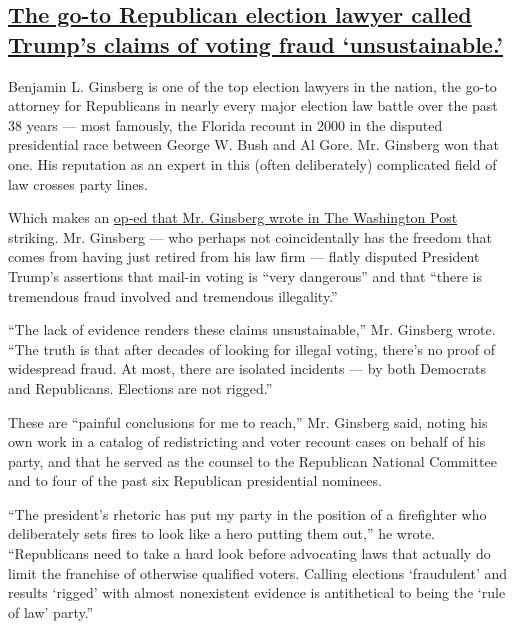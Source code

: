 \hypertarget{the-go-to-republican-election-lawyer-called-trumps-claims-of-voting-fraud-unsustainable}{%
\subsection{\texorpdfstring{\protect\hyperlink{the-go-to-republican-election-lawyer-called-trumps-claims-of-voting-fraud-unsustainable}{The
go-to Republican election lawyer called Trump's claims of voting fraud
`unsustainable.'}}{The go-to Republican election lawyer called Trump's claims of voting fraud `unsustainable.'}}\label{the-go-to-republican-election-lawyer-called-trumps-claims-of-voting-fraud-unsustainable}}

Benjamin L. Ginsberg is one of the top election lawyers in the nation,
the go-to attorney for Republicans in nearly every major election law
battle over the past 38 years --- most famously, the Florida recount in
2000 in the disputed presidential race between George W. Bush and Al
Gore. Mr. Ginsberg won that one. His reputation as an expert in this
(often deliberately) complicated field of law crosses party lines.

Which makes an
\href{https://www.washingtonpost.com/opinions/2020/09/08/republicans-have-insufficient-evidence-call-elections-rigged-fraudulent/}{op-ed
that Mr. Ginsberg wrote in The Washington Post} striking. Mr. Ginsberg
--- who perhaps not coincidentally has the freedom that comes from
having just retired from his law firm --- flatly disputed President
Trump's assertions that mail-in voting is ``very dangerous'' and that
``there is tremendous fraud involved and tremendous illegality.''

``The lack of evidence renders these claims unsustainable,'' Mr.
Ginsberg wrote. ``The truth is that after decades of looking for illegal
voting, there's no proof of widespread fraud. At most, there are
isolated incidents --- by both Democrats and Republicans. Elections are
not rigged.''

These are ``painful conclusions for me to reach,'' Mr. Ginsberg said,
noting his own work in a catalog of redistricting and voter recount
cases on behalf of his party, and that he served as the counsel to the
Republican National Committee and to four of the past six Republican
presidential nominees.

``The president's rhetoric has put my party in the position of a
firefighter who deliberately sets fires to look like a hero putting them
out,'' he wrote. ``Republicans need to take a hard look before
advocating laws that actually do limit the franchise of otherwise
qualified voters. Calling elections `fraudulent' and results `rigged'
with almost nonexistent evidence is antithetical to being the `rule of
law' party.''

